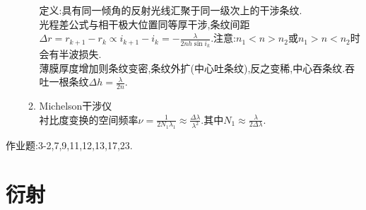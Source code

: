 \documentclass{article}
\begin{document}
\begin{enumerate}
\begin{enumerate}
        定义:具有同一倾角的反射光线汇聚于同一级次上的干涉条纹.\\
        光程差公式与相干极大位置同等厚干涉,条纹间距$\Delta r=r_{k+1}-r_k\propto i_{k+1}-i_k=-\frac{\lambda}{2nh\sin i_k}$.注意:$n_1<n>n_2$或$n_1>n<n_2$时会有半波损失.\\
        薄膜厚度增加则条纹变密,条纹外扩(中心吐条纹),反之变稀,中心吞条纹.吞吐一根条纹$\Delta h=\frac{\lambda}{2n}$.
        \item Michelson干涉仪\\
        衬比度变换的空间频率$\nu=\frac{1}{2N_1\lambda_1}\approx\frac{\Delta \lambda}{\lambda^2}$.其中$N_1\approx\frac{\lambda}{2\Delta\lambda}$.
    \end{enumerate}
\end{enumerate}
作业题:3-2,7,9,11,12,13,17,23.
\section{衍射}
\end{document}
